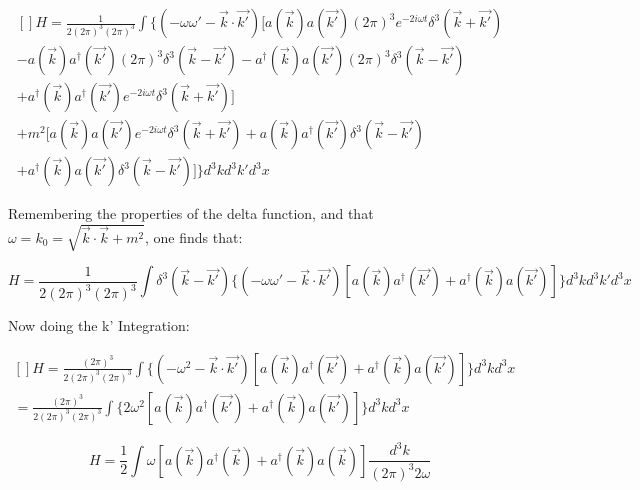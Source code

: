 \documentclass{article}
\begin{document}
    \begin{equation}
        \begin{aligned}[]
            H = \frac{1}{2 (2 \pi)^3 (2 \pi)^3} \int \{ (- \omega \omega' - \vec{k} \cdot \vec{k'}) [a(\vec{k}) a(\vec{k'}) (2 \pi)^{3} e^{-2 i \omega t} \delta^{3}(\vec{k} + \vec{k'}) \\
            - a(\vec{k}) a^{\dag}(\vec{k'}) (2 \pi)^3 \delta^{3} (\vec{k} - \vec{k'}) - a^{\dag}(\vec{k}) a(\vec{k'}) (2 \pi)^3 \delta^{3} (\vec{k} - \vec{k'}) \\
            + a^{\dag}(\vec{k}) a^{\dag}(\vec{k'}) e^{- 2 i \omega t} \delta^{3} (\vec{k} + \vec{k'}) ]\\
            + m^2 [ a(\vec{k}) a(\vec{k'}) e^{- 2 i \omega t} \delta^{3} (\vec{k} + \vec{k'}) + a(\vec{k}) a^{\dag}(\vec{k'}) \delta^{3} (\vec{k} - \vec{k'}) \\
            + a^{\dag}(\vec{k}) a(\vec{k'}) \delta^{3} (\vec{k} - \vec{k'}) ] \} d^{3} k d^{3} k' d^{3} x
        \end{aligned}
    \end{equation}

    Remembering the properties of the delta function, and that $\omega = k_{0} = \sqrt{\vec{k} \cdot \vec{k} + m^{2}}$, one finds that:

    \begin{equation}
        H = \frac{1}{2 (2 \pi)^3 (2 \pi)^3} \int \delta^{3} (\vec{k} - \vec{k'}) \{ (- \omega \omega' - \vec{k} \cdot \vec{k'}) [a(\vec{k}) a^{\dag}(\vec{k'}) + a^{\dag}(\vec{k}) a(\vec{k'})] \}  d^{3} k d^{3} k' d^{3} x
    \end{equation}

    Now doing the k' Integration:

    \begin{equation}
        \begin{aligned}[]
            H = \frac{(2 \pi)^3}{2 (2 \pi)^3 (2 \pi)^3} \int \{ (- \omega^{2} - \vec{k} \cdot \vec{k'}) [a(\vec{k}) a^{\dag}(\vec{k'}) + a^{\dag}(\vec{k}) a(\vec{k'})] \}  d^{3} k d^{3} x \\
            = \frac{(2 \pi)^3}{2 (2 \pi)^3 (2 \pi)^3} \int \{ 2 \omega^{2} [a(\vec{k}) a^{\dag}(\vec{k'}) + a^{\dag}(\vec{k}) a(\vec{k'})] \}  d^{3} k d^{3} x
        \end{aligned}
    \end{equation}

    \begin{equation}
        H = \frac{1}{2} \int \omega [a(\vec{k}) a^{\dag}(\vec{k}) + a^{\dag}(\vec{k}) a(\vec{k})] \frac{d^{3} k}{(2 \pi)^{3} 2 \omega}
    \end{equation}
\end{document}
